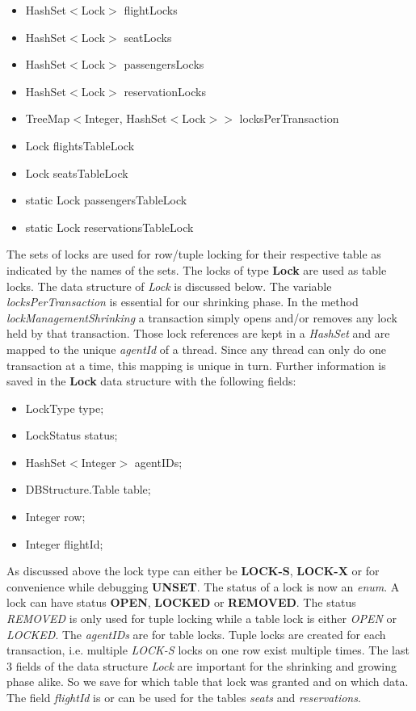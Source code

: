 \documentclass{vldb}
\begin{document}
\begin{itemize}
\begin{itemize}
	\item HashSet$<$Lock$>$ flightLocks
	\item HashSet$<$Lock$>$ seatLocks
	\item HashSet$<$Lock$>$ passengersLocks
	\item HashSet$<$Lock$>$ reservationLocks
	\item TreeMap$<$Integer, HashSet$<$Lock$>>$ locksPerTransaction
	\item Lock flightsTableLock
	\item Lock seatsTableLock
	\item static Lock passengersTableLock
	\item static Lock reservationsTableLock
\end{itemize}
The sets of locks are used for row/tuple locking for their respective table as indicated by the names of the sets. The locks of type \textbf{Lock} are used as table locks. The data structure of \textit{Lock} is discussed below. The variable \textit{locksPerTransaction} is essential for our shrinking phase. In the method \textit{lockManagementShrinking} a transaction simply opens and/or removes any lock held by that transaction. Those lock references are kept in a \textit{HashSet} and are mapped to the unique \textit{agentId} of a thread. Since any thread can only do one transaction at a time, this mapping is unique in turn. Further information is saved in the \textbf{Lock} data structure with the following fields:
\begin{itemize}
	\item LockType type;
	\item LockStatus status;
	\item HashSet$<$Integer$>$ agentIDs;
	\item DBStructure.Table table;
	\item Integer row;
	\item Integer flightId;
\end{itemize}
As discussed above the lock type can either be \textbf{LOCK-S}, \textbf{LOCK-X} or for convenience while debugging \textbf{UNSET}. The status of a lock is now an \textit{enum}. A lock can have status \textbf{OPEN}, \textbf{LOCKED} or \textbf{REMOVED}. The status \textit{REMOVED} is only used for tuple locking while a table lock is either \textit{OPEN} or \textit{LOCKED}. The \textit{agentIDs} are for table locks. Tuple locks are created for each transaction, i.e. multiple \textit{LOCK-S} locks on one row exist multiple times. The last 3 fields of the data structure \textit{Lock} are important for the shrinking and growing phase alike. So we save for which table that lock was granted and on which data. The field \textit{flightId} is or can be used for the tables \textit{seats} and \textit{reservations}.

\end{itemize}
\end{document}
